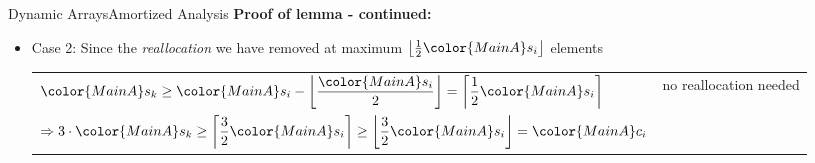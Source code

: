 \begin{frame}{Dynamic Arrays}{Amortized Analysis}
  \textbf{Proof of lemma - continued:}
      \begin{itemize}
        \item
          Case 2: Since the \textit{reallocation} we have removed at
          maximum $\left\lfloor\frac{1}{2} {\color{MainA}s_i} \right\rfloor$
          elements
          \vspace{0.5em}\\
          \begin{tabularx}{\linewidth}{Xr}
           ${\color{MainA}s_k}
             \geq {\color{MainA}s_i} -
               \left\lfloor
                 \dfrac{\color{MainA}s_i}{2}
                 \vphantom{\dfrac{1}{2}}
               \right\rfloor
             = \left\lceil\dfrac{1}{2} {\color{MainA}s_i}\right\rceil$ &
           \multirow{2}{*}{\color{MainA}no reallocation needed}\\[1.0em]
           $\Rightarrow 3 \cdot {\color{MainA}s_k}
             \geq \left\lceil\dfrac{3}{2} {\color{MainA}s_i}\right\rceil
             \geq \left\lfloor\dfrac{3}{2} {\color{MainA}s_i}\right\rfloor
             = {\color{MainA}c_i}$
          \end{tabularx}
      \end{itemize}
\end{frame}


